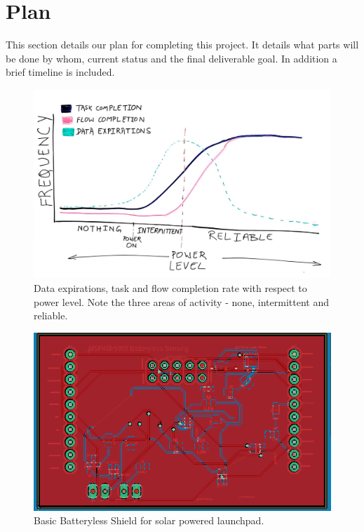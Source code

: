\section{Plan} %
\label{sec:plan}

This section details our plan for completing this project.
It details what parts will be done by whom, current status and the final deliverable goal.
In addition a brief timeline is included.

\begin{figure}[!ht] %
\centering
\includegraphics[width=1.0\linewidth]{Figures/graph.jpeg}
\caption{
 Data expirations, task and flow completion rate with respect to power level.
 Note the three areas of activity - none, intermittent and reliable.
}
\label{f:graph}
\end{figure}

\begin{figure}[!ht] %
\centering
\includegraphics[width=1.0\linewidth]{Figures/circuit.PNG}
\caption{
Basic Batteryless Shield for solar powered launchpad.
}
\label{f:circuit}
\end{figure}


